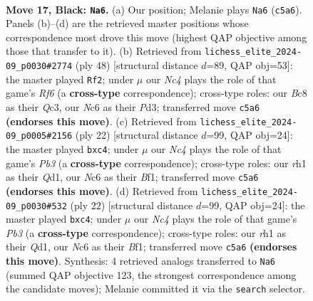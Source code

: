 \documentclass[11pt]{article}
\begin{document}
\clearpage

\begin{figure}[p]\centering
\begin{subfigure}{0.46\textwidth}\centering
\resizebox{\linewidth}{!}{%
\newchessgame
\chessboard[
  setfen={r1bq1k2/pp3pp1/2n1p3/1QnpP3/5P1r/P7/1P4PP/R3KNNR b KQ - 1 17},
  showmover=false,
  pgfstyle=straightmove, color=movearrow, markmove={c5-a6}
]}
\caption{}
\end{subfigure}\hfill
\begin{subfigure}{0.46\textwidth}\centering
\resizebox{\linewidth}{!}{%
\newchessgame
\chessboard[
  setfen={1rbqnrk1/p4p2/3p1Rp1/2pP4/2P1B1Pp/2QPN3/P6P/R5K1 w - - 1 25},
  showmover=false,
  pgfstyle=straightmove, color=movearrow, markmove={f6-f2}
]}
\caption{}
\end{subfigure}
\\[4pt]
\begin{subfigure}{0.46\textwidth}\centering
\resizebox{\linewidth}{!}{%
\newchessgame
\chessboard[
  setfen={rn1qk2r/1b3ppp/4pn2/pp6/2pP4/1P2PN2/1B3PPP/R2QKB1R w KQkq - 3 12},
  showmover=false,
  pgfstyle=straightmove, color=movearrow, markmove={b3-c4}
]}
\caption{}
\end{subfigure}\hfill
\begin{subfigure}{0.46\textwidth}\centering
\resizebox{\linewidth}{!}{%
\newchessgame
\chessboard[
  setfen={rn1qk2r/1b3ppp/4pn2/pp6/2pP4/1P2PN2/1B3PPP/R2QKB1R w KQkq - 3 12},
  showmover=false,
  pgfstyle=straightmove, color=movearrow, markmove={b3-c4}
]}
\caption{}
\end{subfigure}
\caption{\textbf{Move 17, Black: \texttt{Na6}.} (a) Our position; Melanie plays \texttt{Na6} (\texttt{c5a6}). Panels (b)--(d) are the retrieved master positions whose correspondence most drove this move (highest QAP objective among those that transfer to it). (b) Retrieved from \texttt{lichess\_elite\_2024-09\_p0030\#2774} (ply 48) [structural distance $d$=89, QAP obj=53]: the master played \texttt{Rf2}; under $\mu$ our \emph{Nc4} plays the role of that game's \emph{Rf6} (a \textbf{cross-type} correspondence); cross-type roles: our \emph{B}c8 as their \emph{Q}c3, our \emph{N}c6 as their \emph{P}d3; transferred move \texttt{c5a6} \textbf{(endorses this move)}. (c) Retrieved from \texttt{lichess\_elite\_2024-09\_p0005\#2156} (ply 22) [structural distance $d$=99, QAP obj=24]: the master played \texttt{bxc4}; under $\mu$ our \emph{Nc4} plays the role of that game's \emph{Pb3} (a \textbf{cross-type} correspondence); cross-type roles: our \emph{r}h1 as their \emph{Q}d1, our \emph{N}c6 as their \emph{B}f1; transferred move \texttt{c5a6} \textbf{(endorses this move)}. (d) Retrieved from \texttt{lichess\_elite\_2024-09\_p0030\#532} (ply 22) [structural distance $d$=99, QAP obj=24]: the master played \texttt{bxc4}; under $\mu$ our \emph{Nc4} plays the role of that game's \emph{Pb3} (a \textbf{cross-type} correspondence); cross-type roles: our \emph{r}h1 as their \emph{Q}d1, our \emph{N}c6 as their \emph{B}f1; transferred move \texttt{c5a6} \textbf{(endorses this move)}. Synthesis: 4 retrieved analogs transferred to \texttt{Na6} (summed QAP objective 123, the strongest correspondence among the candidate moves); Melanie committed it via the \texttt{search} selector.}

\end{figure}
\end{document}
